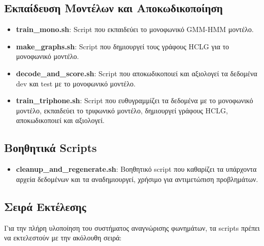 \documentclass[a4paper,12pt]{article}
\begin{document}
\subsection{Εκπαίδευση Μοντέλων και Αποκωδικοποίηση}

\begin{itemize}
    \item \textbf{train\_mono.sh}: Script που εκπαιδεύει το μονοφωνικό GMM-HMM μοντέλο.
    
    \item \textbf{make\_graphs.sh}: Script που δημιουργεί τους γράφους HCLG για το μονοφωνικό μοντέλο.
    
    \item \textbf{decode\_and\_score.sh}: Script που αποκωδικοποιεί και αξιολογεί τα δεδομένα dev και test με το μονοφωνικό μοντέλο.
    
    \item \textbf{train\_triphone.sh}: Script που ευθυγραμμίζει τα δεδομένα με το μονοφωνικό μοντέλο, εκπαιδεύει το τριφωνικό μοντέλο, δημιουργεί γράφους HCLG, αποκωδικοποιεί και αξιολογεί.
\end{itemize}

\subsection{Βοηθητικά Scripts}

\begin{itemize}
    \item \textbf{cleanup\_and\_regenerate.sh}: Βοηθητικό script που καθαρίζει τα υπάρχοντα αρχεία δεδομένων και τα αναδημιουργεί, χρήσιμο για αντιμετώπιση προβλημάτων.
\end{itemize}

\subsection{Σειρά Εκτέλεσης}

Για την πλήρη υλοποίηση του συστήματος αναγνώρισης φωνημάτων, τα scripts πρέπει να εκτελεστούν με την ακόλουθη σειρά:
\end{document}
